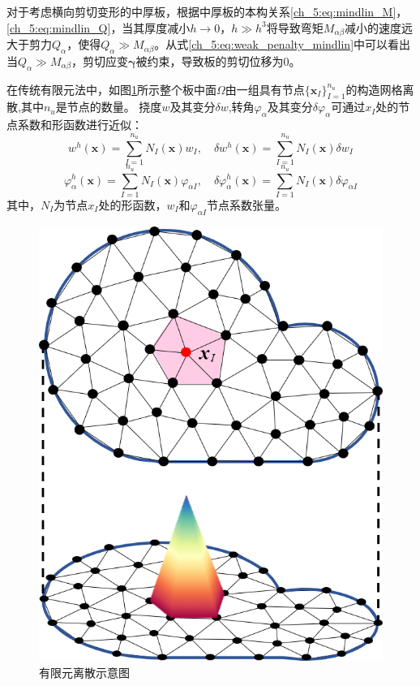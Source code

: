 对于考虑横向剪切变形的中厚板，根据中厚板的本构关系\eqref{ch_5:eq:mindlin_M}，\eqref{ch_5:eq:mindlin_Q}，当其厚度减小$h\rightarrow 0$，$h \gg h^3$将导致弯矩$M_{\alpha \beta}$减小的速度远大于剪力$Q_{\alpha}$，使得$Q_{\alpha}\gg M_{\alpha \beta}$。从式\eqref{ch_5:eq:weak_penalty_mindlin}中可以看出当$Q_{\alpha}\gg M_{\alpha \beta}$，剪切应变$\boldsymbol{\gamma}$被约束，导致板的剪切位移为$0$。

在传统有限元法中，如图\ref{ch_5:fig:mindlin_fem}所示整个板中面$\Omega$由一组具有节点$\{\boldsymbol x_I\}_{I=1}^{n_u}$的构造网格离散,其中$n_u$是节点的数量。
挠度$w$及其变分$\delta w $,转角$\varphi_\alpha$及其变分$\delta \varphi_\alpha $可通过$x_I$处的节点系数和形函数进行近似：
\begin{equation}\label{ch_5:eq:w_h}
    w^h(\boldsymbol x) = \sum_{I=1}^{n_u} N_I(\boldsymbol x) w_I, \quad \delta w^h(\boldsymbol x) = \sum_{I=1}^{n_u} N_I(\boldsymbol x) \delta w_I
\end{equation}
\begin{equation}\label{ch_5:eq:varphi_h}
    \varphi^h_{\alpha}(\boldsymbol x) = \sum_{I=1}^{n_u} N_I(\boldsymbol x) \varphi_{\alpha I}, \quad \delta \varphi^h_{\alpha}(\boldsymbol x) = \sum_{I=1}^{n_u} N_I(\boldsymbol x) \delta \varphi_{\alpha I}
\end{equation}
其中，$N_I$为节点$x_I$处的形函数，$w_I$和$\varphi_{\alpha I}$节点系数张量。
\begin{figure}[!h]
    \centering 
        \includegraphics[scale=0.6]{figures/fem.png}
        \caption{有限元离散示意图}\label{ch_5:fig:mindlin_fem}
\end{figure}

